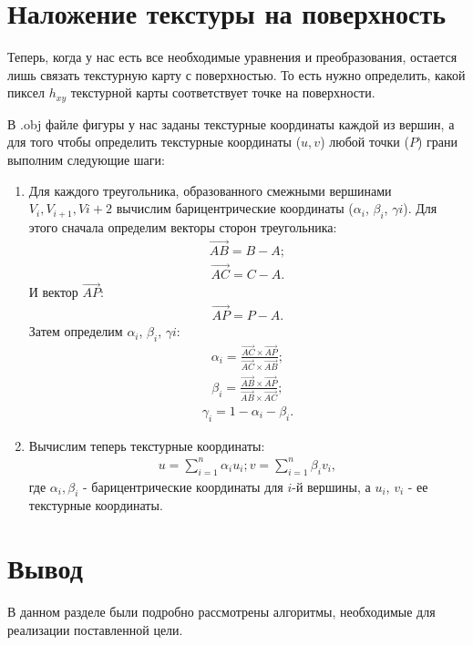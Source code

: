 \section{Наложение текстуры на поверхность}

Теперь, когда у нас есть все необходимые уравнения и преобразования, остается лишь связать текстурную карту с поверхностью. То есть нужно определить, какой пиксел $h_{xy}$ текстурной карты соответствует точке на поверхности.

В .obj файле фигуры у нас заданы текстурные координаты каждой из вершин, а для того чтобы определить текстурные координаты ($u, v$) любой точки ($P$) грани выполним следующие шаги:

\begin{enumerate}[label=\arabic*)]
	\item Для каждого треугольника, образованного смежными вершинами $V_{i}, V_{i+1}, V{i+2}$ вычислим барицентрические координаты ($\alpha_{i}$, $\beta_{i}$, $\gamma{i}$). Для этого сначала определим векторы сторон треугольника:
	\begin{gather}
		\vec{AB} = B - A;
	\end{gather}
	\begin{gather}
		\vec{AC} = C - A.
	\end{gather}
	И вектор $\vec{AP}$:
	\begin{gather}
		\vec{AP} = P - A.
	\end{gather}
	Затем определим $\alpha_{i}$, $\beta_{i}$, $\gamma{i}$:
	\begin{gather}
		\alpha_{i} = \frac{\vec{AC}\times\vec{AP}}{\vec{AC}\times\vec{AB}};
	\end{gather}
	\begin{gather}
		\beta_{i} = \frac{\vec{AB}\times\vec{AP}}{\vec{AB}\times\vec{AC}};
	\end{gather}
	\begin{gather}
		\gamma_{i} = 1 - \alpha_{i} - \beta_{i}.
	\end{gather}
	\item Вычислим теперь текстурные координаты:
	\begin{gather}
		u = \sum_{i=1}^n \alpha_{i}u_{i};
		v = \sum_{i=1}^n \beta_{i}v_{i},
	\end{gather}
	где $\alpha_{i}, \beta_{i}$ - барицентрические координаты для $i$-й вершины, а $u_{i}$, $v_{i}$ - ее текстурные координаты.
\end{enumerate}

\section*{Вывод}

В данном разделе были подробно рассмотрены алгоритмы, необходимые для реализации поставленной цели.